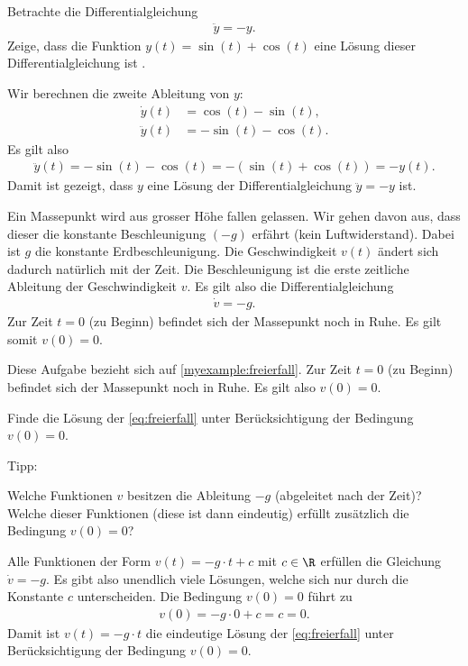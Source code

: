 \begin{myexercise}
  Betrachte die Differentialgleichung
  \begin{align*}
    \ddot{y} = -y.
  \end{align*}
  Zeige, dass die Funktion $y(t) = \sin(t) + \cos(t)$ eine Lösung dieser Differentialgleichung ist .
  \begin{myanswer}
    Wir berechnen die zweite Ableitung von $y$:
    \begin{align*}
      \dot{y}(t) &= \cos(t) - \sin(t),\\
      \ddot{y}(t) &= -\sin(t) - \cos(t).
    \end{align*}
    Es gilt also
    \begin{align*}
      \ddot{y}(t) = -\sin(t) - \cos(t) = -( \sin(t) + \cos(t)) = -y(t).
    \end{align*}
    Damit ist gezeigt, dass $y$ eine Lösung der Differentialgleichung $\ddot{y} = -y$ ist.
  \end{myanswer}
\end{myexercise}

\begin{myexample}\label{myexample:freierfall}
  Ein Massepunkt wird aus grosser Höhe fallen gelassen. Wir gehen davon aus, dass dieser die konstante Beschleunigung $(-g)$ erfährt (kein Luftwiderstand).
  Dabei ist $g$ die konstante Erdbeschleunigung. Die Geschwindigkeit $v(t)$ ändert sich dadurch natürlich mit der Zeit. Die Beschleunigung ist die erste zeitliche Ableitung der Geschwindigkeit $v$. Es gilt also die Differentialgleichung
  \begin{align}\label{eq:freierfall}
  \dot{v} = -g.
\end{align}
Zur Zeit $t = 0$ (zu Beginn) befindet sich der Massepunkt noch in Ruhe. Es gilt somit $v(0) = 0$. 
\end{myexample}

\begin{myexercise}
  Diese Aufgabe bezieht sich auf \cref{myexample:freierfall}.
  Zur Zeit $t = 0$ (zu Beginn) befindet sich der Massepunkt noch in Ruhe. Es gilt also $v(0) = 0$. 

  Finde die Lösung der \cref{eq:freierfall} unter Berücksichtigung der Bedingung $v(0) = 0$.
  
  Tipp:

  Welche Funktionen $v$ besitzen die Ableitung $-g$ (abgeleitet nach der Zeit)? Welche dieser Funktionen (diese ist dann eindeutig) erfüllt zusätzlich die Bedingung $v(0) = 0$? 
  \begin{myanswer}
    Alle Funktionen der Form $v(t) = -g\cdot t + c$ mit $c\in\R$ erfüllen die Gleichung $\dot{v} = -g$. 
    Es gibt also unendlich viele Lösungen, welche sich nur durch die Konstante $c$ unterscheiden.
    Die Bedingung $v(0) = 0$ führt zu
    \begin{align*}
      v(0) = -g\cdot 0 + c = c = 0.
    \end{align*}
    Damit ist $v(t) = -g\cdot t$ die eindeutige Lösung der \cref{eq:freierfall} unter Berücksichtigung der Bedingung $v(0) = 0$.
  \end{myanswer}
\end{myexercise}

